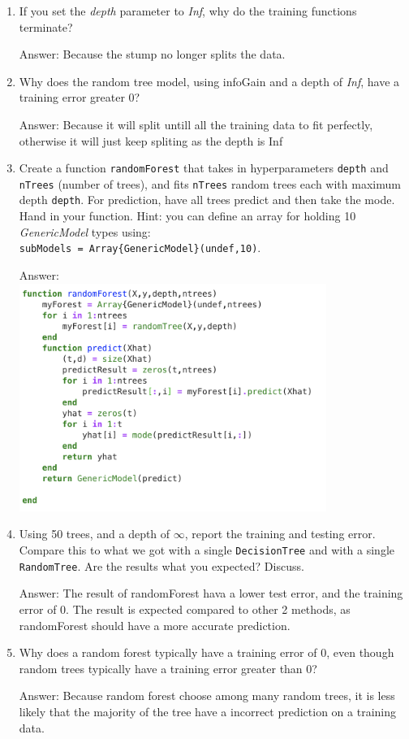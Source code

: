 \documentclass{article}
\def\ans#1{\par\gre{Answer: #1}}
\def\blu#1{{\color{blu}#1}}
\def\gre#1{{\color{gre}#1}}
\def\enum#1{\begin{enumerate}#1\end{enumerate}}
\begin{document}
\blu{
\enum{
\item If you set the \emph{depth} parameter to \emph{Inf}, why do the training functions terminate? \ans{Because the stump no longer splits the data.}
\item Why does the random tree model, using infoGain and a depth of \emph{Inf}, have a training error greater 0? \ans{Because it will split untill all the training data to fit perfectly, otherwise it will just keep spliting as the depth is Inf}
\item Create a function \texttt{randomForest} that takes in hyperparameters \texttt{depth} and \texttt{nTrees} (number of trees), and 
fits \texttt{nTrees} random trees each with maximum depth \texttt{depth}. For prediction, have all trees predict and then take the mode. Hand in your function. Hint: you can define an array for holding 10 \emph{GenericModel} types using:\\
\texttt{subModels = Array\{GenericModel\}(undef,10)}.
\ans{\\ \includegraphics[width = 10cm]{Q4RandomForest.png}}
\item Using 50 trees, and a depth of $\infty$, report the training and testing error. Compare this to what we got with a single \texttt{DecisionTree} and with a single \texttt{RandomTree}. Are the results what you expected? Discuss.  \ans{The result of randomForest hava a lower test error, and the training error of 0. The result is expected compared to other 2 methods, as randomForest should have a more accurate prediction.}
\item Why does a random forest typically have a training error of 0, even though random trees typically have a training error greater than 0?
\ans{Because random forest choose among many random trees, it is less likely that the majority of the tree have a incorrect prediction on a training data.}
}
}
\end{document}
